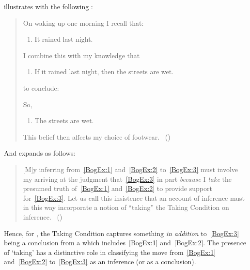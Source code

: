 \begin{note}
  \citeauthor{Boghossian:2014aa} illustrates with the following \scen{}:
  \begin{quote}
    On waking up one morning I recall that:

    \begin{enumerate}[label=(\arabic*), ref=(\arabic*), series=BogEx]
    \item
      \label{BogEx:1}
      It rained last night.
    \end{enumerate}

    I combine this with my knowledge that

    \begin{enumerate}[label=(\arabic*), ref=(\arabic*), resume*=BogEx]
    \item
      \label{BogEx:2}
      If it rained last night, then the streets are wet.
    \end{enumerate}

    to conclude:

    So,

    \begin{enumerate}[label=(\arabic*), ref=(\arabic*), resume*=BogEx]
    \item
      \label{BogEx:3}
      The streets are wet.
    \end{enumerate}
    This belief then affects my choice of footwear.%
    \mbox{ }\hfill\mbox{(\citeyear[2]{Boghossian:2014aa})}
  \end{quote}

  And \citeauthor{Boghossian:2014aa} expands as follows:

  \begin{quote}
    [M]y inferring from~\ref{BogEx:1} and~\ref{BogEx:2} to~\ref{BogEx:3} must involve my arriving at the judgment that~\ref{BogEx:3} in part \emph{because} I \emph{take} the presumed truth of~\ref{BogEx:1} and~\ref{BogEx:2} to provide support for~\ref{BogEx:3}.
    Let us call this insistence that an account of inference must in this way incorporate a notion of ``taking'' the Taking Condition on inference.%
    \mbox{ }\hfill\mbox{(\citeyear[4]{Boghossian:2014aa})}
  \end{quote}

  Hence, for \citeauthor{Boghossian:2014aa}, the Taking Condition captures something \emph{in addition} to~\ref{BogEx:3} being a conclusion from a \pool{} which includes~\ref{BogEx:1} and~\ref{BogEx:2}.
  The presence of `taking' has a distinctive role in classifying the move from~\ref{BogEx:1} and~\ref{BogEx:2} to~\ref{BogEx:3} as an inference (or as a conclusion).


\end{note}
